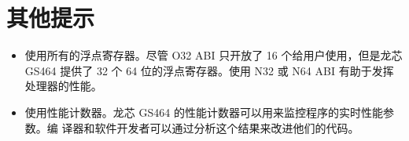 \section{其他提示}

\begin{itemize}
  \item 使用所有的浮点寄存器。尽管 O32 ABI 只开放了 16 个给用户使用，但是龙芯
    GS464 提供了 32 个 64 位的浮点寄存器。使用 N32 或 N64 ABI
    有助于发挥处理器的性能。
  \item 使用性能计数器。龙芯 GS464 的性能计数器可以用来监控程序的实时性能参数。编
    译器和软件开发者可以通过分析这个结果来改进他们的代码。
\end{itemize}

